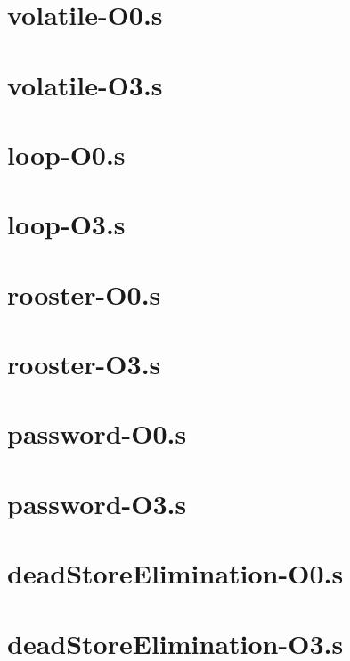 \begin{appendices}
\section{volatile-O0.s}

\section{volatile-O3.s}


\section{loop-O0.s}

\section{loop-O3.s}


\section{rooster-O0.s}

\section{rooster-O3.s}


\section{password-O0.s}

\section{password-O3.s}


\section{deadStoreElimination-O0.s}

\section{deadStoreElimination-O3.s}



\end{appendices}

